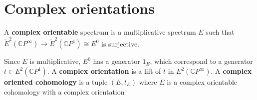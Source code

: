 \section{Complex orientations}\label{sec:chromatichomotopy-complexorientation}



\begin{definition}
    A \textbf{complex orientable} spectrum is a multiplicative spectrum $E$ such that $\tilde E^2(\mathbb{C}P^\infty)\to \tilde E^2(\mathbb{C}P^1)\cong E^0$ is surjective.

    Since $E$ is multiplicative, $E^0$ has a generator $1_E$, which correspond to a generator $t\in E^2(\mathbb{C}P^1)$. A \textbf{complex orientation} is a lift of $t$ in $E^2(\mathbb{C}P^\infty)$. A \textbf{complex oriented cohomology} is a tuple $(E,t_E)$ where $E$ is a complex orientable cohomology with a complex orientation
\end{definition}

